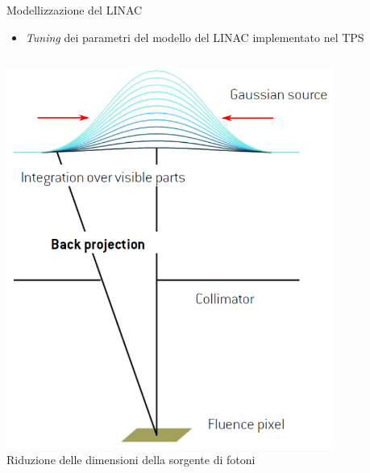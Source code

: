 \documentclass{beamer}
\begin{document}
\begin{frame}[t]{Modellizzazione del LINAC}
\begin{itemize}
\scriptsize
{}
\item \alert{\textit{Tuning} dei parametri del modello del LINAC implementato nel TPS}
\end{itemize}
\begin{columns}[t]
\centering
\includegraphics[width=0.8\textwidth]{./img/profile_model1.png}\\ \vspace{.2cm}
\footnotesize
\alert{Riduzione delle dimensioni della sorgente di fotoni}
\centering

\end{columns}
\end{frame}
\end{document}
